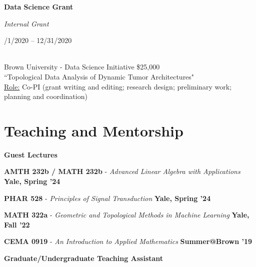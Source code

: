 \documentclass[margin,line]{res}
\newenvironment{list1}{
  \begin{list}{\ding{113}}{
      \setlength{\itemsep}{0in}
      \setlength{\parsep}{0in} \setlength{\parskip}{0in}
      \setlength{\topsep}{0in} \setlength{\partopsep}{0in}
      \setlength{\leftmargin}{0.17in}}}{\end{list}}
\begin{document}
\begin{resume}
\noindent
\begin{minipage}[t]{0.4\textwidth}
    \raggedright \textbf{Data Science Grant}
\end{minipage}%
\begin{minipage}[t]{0.3\textwidth}
    \centering \textit{Internal Grant}
\end{minipage}%
\begin{minipage}[t]{0.3\textwidth}
    /1/2020 -- 12/31/2020
\end{minipage}
\\[.2em]
Brown University - Data Science Initiative \hfill \$25,000 \\[.2em]
``Topological Data Analysis of Dynamic Tumor Architectures"\\[.2em]
\ul{Role:} Co-PI {\small(grant writing and editing; research design; preliminary work; planning and coordination)}


\section{\sc Teaching and Mentorship}


\textbf{Guest Lectures}
\vspace*{.2cm}

\begin{list1}
\setlength\itemsep{0.25em}
\item[] {\bf AMTH 232b / MATH 232b} - \textit{Advanced Linear Algebra with Applications} \hfill {\bf \small Yale, Spring '24}
\item[] {\bf PHAR 528} - \textit{Principles of Signal Transduction} \hfill {\bf \small Yale, Spring '24}
\item[] {\bf MATH 322a} - \textit{Geometric and Topological Methods in Machine Learning} \hfill {\bf \small Yale, Fall '22}
\item[] {\bf CEMA 0919} - \textit{An Introduction to Applied Mathematics} \hfill {\bf \small Summer@Brown '19}
\end{list1} 


\textbf{Graduate/Undergraduate Teaching Assistant}
\vspace*{.2cm}


\end{resume}
\end{document}
